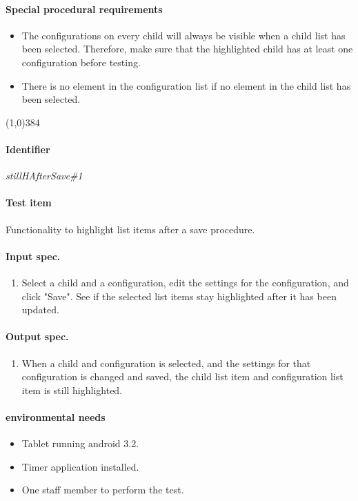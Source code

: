 \paragraph{Special procedural requirements}
	\begin{itemize}
		\item The configurations on every child will always be visible when a child list has been selected. Therefore, make sure that the highlighted child has at least one configuration before testing.
		\item There is no element in the configuration list if no element in the child list has been selected.
	\end{itemize}
\begin{center}
	\line(1,0){384}
\end{center}

\paragraph{Identifier}
	\textit{stillHAfterSave\#1}
\paragraph{Test item}
	Functionality to highlight list items after a save procedure.
\paragraph{Input spec.}
	\begin{enumerate}
		\item Select a child and a configuration, edit the settings for the configuration, and click "Save". See if the selected list items stay highlighted after it has been updated.
	\end{enumerate}
\paragraph{Output spec.}
	\begin{enumerate}
		\item When a child and configuration is selected, and the settings for that configuration is changed and saved, the child list item and configuration list item is still highlighted.
	\end{enumerate}
\paragraph{environmental needs}
	\begin{itemize}
		\item Tablet running android 3.2.
		\item Timer application installed.
		\item One staff member to perform the test.
	\end{itemize}
